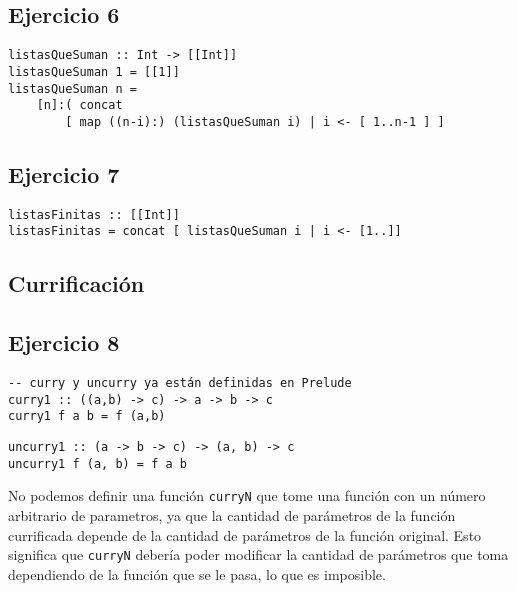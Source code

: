 \subsection{Ejercicio 6}
\begin{centrado}
\begin{verbatim}
listasQueSuman :: Int -> [[Int]]
listasQueSuman 1 = [[1]]
listasQueSuman n = 
    [n]:( concat 
	    [ map ((n-i):) (listasQueSuman i) | i <- [ 1..n-1 ] ] 
\end{verbatim}
\end{centrado}

\subsection{Ejercicio 7}

\begin{centrado}
	\begin{verbatim}
listasFinitas :: [[Int]]
listasFinitas = concat [ listasQueSuman i | i <- [1..]]
\end{verbatim}
\end{centrado}	

\subsection*{Currificación}
\subsection{Ejercicio 8}
\begin{centrado}
	\begin{verbatim}
-- curry y uncurry ya están definidas en Prelude
curry1 :: ((a,b) -> c) -> a -> b -> c
curry1 f a b = f (a,b)
	\end{verbatim}
\end{centrado}

\begin{centrado}
\begin{verbatim}
uncurry1 :: (a -> b -> c) -> (a, b) -> c
uncurry1 f (a, b) = f a b
	\end{verbatim}
\end{centrado}

No podemos definir una función \texttt{curryN} que tome una función con un número arbitrario de parametros, ya que la cantidad de parámetros de la función currificada depende de la cantidad de parámetros de la función original. Esto significa que \texttt{curryN} debería poder modificar la cantidad de parámetros que toma dependiendo de la función que se le pasa, lo que es imposible.

